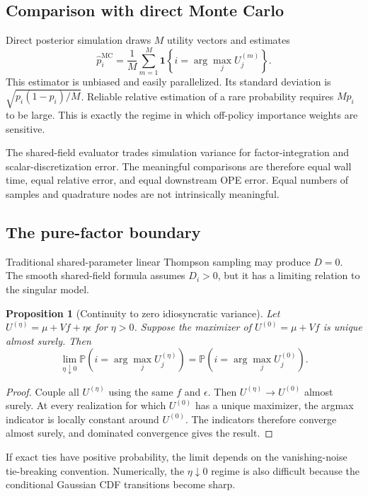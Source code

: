 \documentclass[11pt]{article}
\newtheorem{proposition}[theorem]{Proposition}
\newcommand{\Prob}{\mathbb{P}}
\newcommand{\ind}{\mathbf{1}}
\begin{document}
\subsection{Comparison with direct Monte Carlo}

Direct posterior simulation draws $M$ utility vectors and estimates
\[
\widehat p_i^{\mathrm{MC}}
=
\frac{1}{M} \sum_{m=1}^M
\ind\!\left\{ i = \arg\max_j U_j^{(m)} \right\}.
\]
This estimator is unbiased and easily parallelized. Its standard deviation is $\sqrt{p_i(1 - p_i)/M}$. Reliable relative estimation of a rare probability requires $M p_i$ to be large. This is exactly the regime in which off-policy importance weights are sensitive.

The shared-field evaluator trades simulation variance for factor-integration and scalar-discretization error. The meaningful comparisons are therefore equal wall time, equal relative error, and equal downstream OPE error. Equal numbers of samples and quadrature nodes are not intrinsically meaningful.

\subsection{The pure-factor boundary}

Traditional shared-parameter linear Thompson sampling may produce $D = 0$. The smooth shared-field formula assumes $D_i > 0$, but it has a limiting relation to the singular model.

\begin{proposition}[Continuity to zero idiosyncratic variance]
\label{prop:continuity}
Let $U^{(\eta)} = \mu + V f + \eta \epsilon$ for $\eta > 0$. Suppose the maximizer of $U^{(0)} = \mu + V f$ is unique almost surely. Then
\[
\lim_{\eta \downarrow 0}
\Prob\!\left( i = \arg\max_j U_j^{(\eta)} \right)
=
\Prob\!\left( i = \arg\max_j U_j^{(0)} \right).
\]
\end{proposition}

\begin{proof}
Couple all $U^{(\eta)}$ using the same $f$ and $\epsilon$. Then $U^{(\eta)} \to U^{(0)}$ almost surely. At every realization for which $U^{(0)}$ has a unique maximizer, the argmax indicator is locally constant around $U^{(0)}$. The indicators therefore converge almost surely, and dominated convergence gives the result.
\end{proof}

If exact ties have positive probability, the limit depends on the vanishing-noise tie-breaking convention. Numerically, the $\eta \downarrow 0$ regime is also difficult because the conditional Gaussian CDF transitions become sharp.
\end{document}
